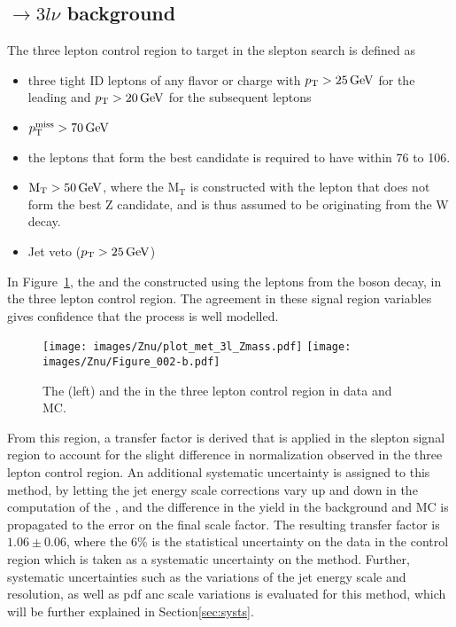 \subsection*{\PWZ$\rightarrow3l\nu$ background}
\noindent
\justify
The three lepton control region to target \PWZ in the slepton search is defined as
\begin{itemize}
    \item three tight ID leptons of any flavor or charge with $p_{\mathrm{T}}>25\,\text{Ge\hspace{-.08em}V}$ for the leading and $p_{\mathrm{T}}>20\,\text{Ge\hspace{-.08em}V}$ for the subsequent leptons
    \item $p_{\mathrm{T}}^\text{miss}>70\,\text{Ge\hspace{-.08em}V}$
    \item the leptons that form the best \PZ candidate is required to have \mll within 76 to 106\GeV.
    \item $\mathrm{M_{T}}>50\,\text{Ge\hspace{-.08em}V}$, where the $\mathrm{M_{T}}$ is constructed with the lepton that does not form the best Z candidate, and is thus assumed to be originating from the W decay.
    \item Jet veto ($p_{\mathrm{T}}>25\,\text{Ge\hspace{-.08em}V}$)
\end{itemize}
In Figure~\ref{fig:WZmet}, the \ptmiss and the \mttwo constructed using the leptons from the \PZ boson decay, in the three lepton control region.
The agreement in these signal region variables gives confidence that the \PWZ process is well modelled.
\begin{figure}[htbp!]
\begin{center}
\texttt{[image: images/Znu/plot\_met\_3l\_Zmass.pdf]}
\texttt{[image: images/Znu/Figure\_002-b.pdf]}
\caption{The \ptmiss (left) and the \mttwo in the three lepton control region in data and MC. }
\label{fig:WZmet}
\end{center}
\end{figure}
From this region, a transfer factor is derived that is applied in the slepton signal region to account for the slight difference in normalization observed in the three lepton control region.
An additional systematic uncertainty is assigned to this method, by letting the jet energy scale corrections vary up and down in the computation of the \ptmiss, and the difference in the yield in the     background and \PWZ MC is propagated to the error on the final scale factor.
The resulting transfer factor is $1.06\pm0.06$, where the 6\% is the statistical uncertainty on the data in the control region which is taken as a systematic uncertainty on the method.
Further, systematic uncertainties such as the variations of the jet energy scale and resolution, as well as pdf anc scale variations is evaluated for this method, which will be further explained in Section\ref{sec:systs}.
